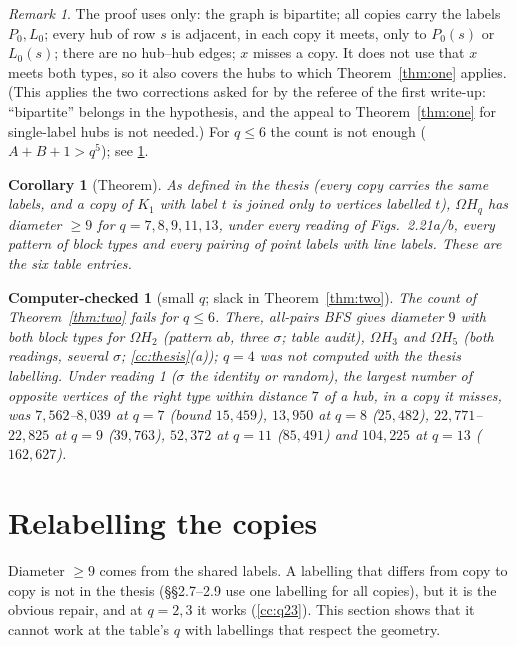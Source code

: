 \documentclass[11pt]{amsart}
\theoremstyle{plain}
\newtheorem{corollary}[lemma]{Corollary}
\newtheorem{computer}{Computer-checked}
\theoremstyle{definition}
\theoremstyle{remark}
\newtheorem*{remark}{Remark}
\newcommand{\Om}{\Omega}
\begin{document}
\begin{remark}
The proof uses only: the graph is bipartite; all copies carry the labels $P_0, L_0$; every hub of row $s$ is adjacent, in
each copy it meets, only to $P_0(s)$ or $L_0(s)$; there are no hub--hub edges; $x$ misses a copy. It does not use that $x$
meets both types, so it also covers the hubs to which Theorem~\ref{thm:one} applies. (This applies the two corrections
asked for by the referee of the first write-up: ``bipartite'' belongs in the hypothesis, and the appeal to
Theorem~\ref{thm:one} for single-label hubs is not needed.) For $q \le 6$ the count is not enough ($A + B + 1 > q^5$); see
\ref{cc:small}.
\end{remark}

\begin{corollary}[Theorem]\label{cor:two}
As defined in the thesis (every copy carries the same labels, and a copy of $K_1$ with label $t$ is joined only to
vertices labelled $t$), $\Om H_q$ has diameter $\ge 9$ for $q = 7, 8, 9, 11, 13$, under every reading of Figs.~2.21a/b,
every pattern of block types and every pairing of point labels with line labels. These are the six table entries.
\end{corollary}

\begin{computer}[small $q$; slack in Theorem~\ref{thm:two}]\label{cc:small}
The count of Theorem~\ref{thm:two} fails for $q \le 6$. There, all-pairs BFS gives diameter $9$ with both block types for
$\Om H_2$ (pattern $ab$, three $\sigma$; table audit), $\Om H_3$ and $\Om H_5$ (both readings, several $\sigma$;
\ref{cc:thesis}(a)); $q = 4$ was not computed with the thesis labelling. Under reading 1 ($\sigma$ the identity or random), the largest
number of opposite vertices of the right type within distance $7$ of a hub, in a copy it misses, was $7{,}562$--$8{,}039$
at $q = 7$ (bound $15{,}459$), $13{,}950$ at $q = 8$ ($25{,}482$), $22{,}771$--$22{,}825$ at $q = 9$ ($39{,}763$),
$52{,}372$ at $q = 11$ ($85{,}491$) and $104{,}225$ at $q = 13$ ($162{,}627$).
\end{computer}

\section{Relabelling the copies}\label{sec:relabel}

Diameter $\ge 9$ comes from the shared labels. A labelling that differs from copy to copy is not in the thesis
(\S\S2.7--2.9 use one labelling for all copies), but it is the obvious repair, and at $q = 2, 3$ it works
(\ref{cc:q23}). This section shows that it cannot work at the table's $q$ with labellings that respect the geometry.
\end{document}
